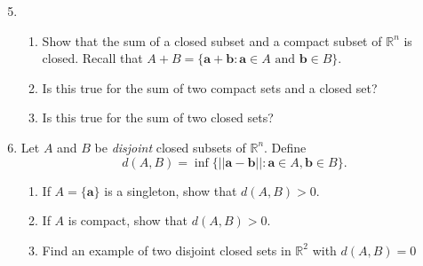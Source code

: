 \documentclass[letterpaper]{article}
\begin{document}
\begin{enumerate}
\begin{enumerate}
  \setcounter{enumii}{4}
  \item
    \begin{enumerate}
    \item
      Show that the sum of a closed subset and a compact subset of $\mathbb{R}^n$ is closed. Recall that $A+B=\{\boldsymbol{a}+\boldsymbol{b}:\boldsymbol{a}\in A\text{ and }\boldsymbol{b}\in B\}$.
    \item
      Is this true for the sum of two compact sets and a closed set?
    \item
      Is this true for the sum of two closed sets?
    \end{enumerate}
  \setcounter{enumii}{8}
  \item
    Let $A$ and $B$ be {\em disjoint} closed subsets of $\mathbb{R}^n$. Define
    \[d(A,B)=\inf\{||\boldsymbol{a-b}||:\boldsymbol{a}\in A,\boldsymbol{b}\in B\}.\]
    \begin{enumerate}
    \item
      If $A=\{\boldsymbol{a}\}$ is a singleton, show that $d(A,B)>0$.
    \item
      If $A$ is compact, show that $d(A,B)>0$.
    \item
      Find an example of two disjoint closed sets in $\mathbb{R}^2$ with $d(A,B)=0$
    \end{enumerate}
  \end{enumerate}
\end{enumerate}
\end{document}

